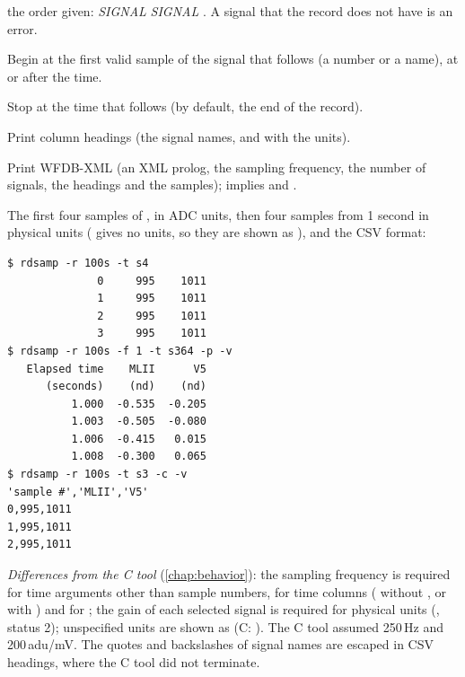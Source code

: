 \begin{params}
  the order given:  \textit{SIGNAL} \code{[}\textit{SIGNAL} \code{...]}. A signal that
  the record does not have is an error.
\item[-S] Begin at the first valid sample of the signal that follows (a number or a name),
  at or after the  time.
\item[-t] Stop at the time that follows (by default, the end of the record).
\item[-v] Print column headings (the signal names, and with  the units).
\item[-X] Print WFDB-XML (an XML prolog, the sampling frequency, the number of signals,
  the headings and the samples); implies  and .
\end{params}
The first four samples of , in ADC units, then four samples from 1 second in
physical units ( gives no units, so they are shown as ), and the CSV
format:
\begin{lstlisting}[style=text]
$ rdsamp -r 100s -t s4
              0     995    1011
              1     995    1011
              2     995    1011
              3     995    1011
$ rdsamp -r 100s -f 1 -t s364 -p -v
   Elapsed time    MLII      V5
      (seconds)    (nd)    (nd)
          1.000  -0.535  -0.205
          1.003  -0.505  -0.080
          1.006  -0.415   0.015
          1.008  -0.300   0.065
$ rdsamp -r 100s -t s3 -c -v
'sample #','MLII','V5'
0,995,1011
1,995,1011
2,995,1011
\end{lstlisting}
\textit{Differences from the C tool} (\cref{chap:behavior}): the sampling frequency is
required for time arguments other than sample numbers, for time columns ( without
, or with ) and for ; the gain of each selected signal is required
for physical units (, status 2);
unspecified units are shown as  (C: ). The C tool assumed 250\,Hz and
200\,adu/mV. The quotes and backslashes of signal names are escaped in CSV headings, where
the C tool did not terminate.

